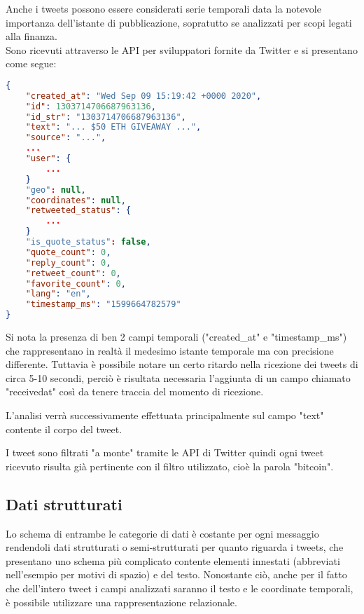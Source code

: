 Anche i tweets possono essere considerati serie temporali data la notevole importanza
dell'istante di pubblicazione, sopratutto se analizzati per scopi legati alla finanza.
\\
Sono ricevuti attraverso le API per sviluppatori fornite da Twitter \cite{twitter} e si
presentano come segue:

\begin{lstlisting}[language=json,firstnumber=1]
{
    "created_at": "Wed Sep 09 15:19:42 +0000 2020",
    "id": 1303714706687963136,
    "id_str": "1303714706687963136",
    "text": "... $50 ETH GIVEAWAY ...",
    "source": "...",
    ...
    "user": {
        ...
    }
    "geo": null,
    "coordinates": null,
    "retweeted_status": {
        ...
    }
    "is_quote_status": false,
    "quote_count": 0,
    "reply_count": 0,
    "retweet_count": 0,
    "favorite_count": 0,
    "lang": "en",
    "timestamp_ms": "1599664782579"
}
\end{lstlisting}
%
Si nota la presenza di ben 2 campi temporali ("created\_at" e "timestamp\_ms") che
rappresentano in realtà il medesimo istante temporale ma con precisione differente.
Tuttavia è possibile notare un certo ritardo nella ricezione dei tweets di circa 5-10
secondi, perciò è risultata necessaria l'aggiunta di un campo chiamato "receivedat" così
da tenere traccia del momento di ricezione.

L'analisi verrà successivamente effettuata principalmente sul campo "text" contente il
corpo del tweet.

I tweet sono filtrati "a monte" tramite le API di Twitter quindi ogni tweet ricevuto risulta già
pertinente con il filtro utilizzato, cioè la parola "bitcoin".

\subsection{Dati strutturati}

Lo schema di entrambe le categorie di dati è costante per ogni messaggio rendendoli dati
strutturati o semi-strutturati per quanto riguarda i tweets, che presentano uno schema più complicato
contente elementi innestati (abbreviati nell'esempio per motivi di spazio) e del testo.
Nonostante ciò, anche per il fatto che dell'intero tweet i campi analizzati saranno il testo
e le coordinate temporali, è possibile utilizzare una rappresentazione relazionale.